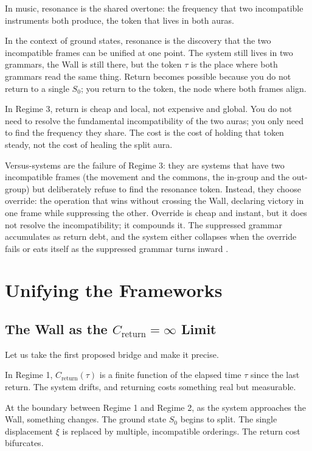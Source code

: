 \documentclass[12pt]{article}
\theoremstyle{definition}
\theoremstyle{remark}
\begin{document}
In music, resonance is the shared overtone: the frequency that two incompatible instruments both produce, the token that lives in both auras.

In the context of ground states, resonance is the discovery that the two incompatible frames can be unified at one point. The system still lives in two grammars, the Wall is still there, but the token $\tau$ is the place where both grammars read the same thing. Return becomes possible because you do not return to a single $S_0$; you return to the token, the node where both frames align.

In Regime 3, return is cheap and local, not expensive and global. You do not need to resolve the fundamental incompatibility of the two auras; you only need to find the frequency they share. The cost is the cost of holding that token steady, not the cost of healing the split aura.

Versus-systems are the failure of Regime 3: they are systems that have two incompatible frames (the movement and the commons, the in-group and the out-group) but deliberately refuse to find the resonance token. Instead, they choose override: the operation that wins without crossing the Wall, declaring victory in one frame while suppressing the other. Override is cheap and instant, but it does not resolve the incompatibility; it compounds it. The suppressed grammar accumulates as return debt, and the system either collapses when the override fails or eats itself as the suppressed grammar turns inward \cite{versus}.

\section{Unifying the Frameworks}

\subsection{The Wall as the $C_{\text{return}}=\infty$ Limit}

Let us take the first proposed bridge and make it precise.

In Regime 1, $C_{\text{return}}(\tau)$ is a finite function of the elapsed time $\tau$ since the last return. The system drifts, and returning costs something real but measurable.

At the boundary between Regime 1 and Regime 2, as the system approaches the Wall, something changes. The ground state $S_0$ begins to split. The single displacement $\xi$ is replaced by multiple, incompatible orderings. The return cost bifurcates.
\end{document}
